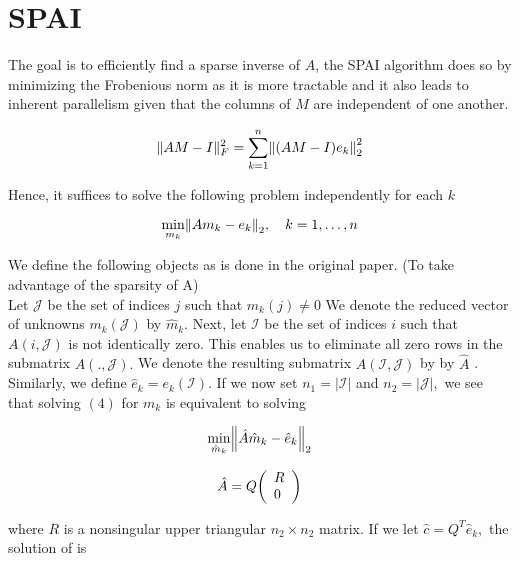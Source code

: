 \documentclass[paper=A4, fontsize=11pt]{scrartcl}
\let\originalleft\left
\let\originalright\right
\renewcommand{\left}{\mathopen{}\mathclose\bgroup\originalleft}
\renewcommand{\right}{\aftergroup\egroup\originalright}
\theoremstyle{remark}
\begin{document}
\section{SPAI}

The goal is to efficiently find a sparse inverse of $A$, the SPAI algorithm does so by minimizing the Frobenious norm as it is more tractable and it also leads to inherent parallelism given that the columns of $M$ are independent of one another.

\begin{equation}
\|A M-I\|_{F}^{2}=\sum_{k=1}^{n}\left\|(A M-I) e_{k}\right\|_{2}^{2}
\end{equation}

Hence, it suffices to solve the following problem independently for each $k$


\begin{equation}
\min _{m_{k}}\left\|A m_{k}-e_{k}\right\|_{2}, \quad k=1, \ldots, n
\end{equation}


We define the following objects as is done in the original paper. (To take advantage of the sparsity of A)\\

Let \(\mathcal{J}\) be the set of indices \(j\) such that \(m_{k}(j) \neq 0\) We denote the reduced vector of unknowns \(m_{k}(\mathcal{J})\) by \(\hat{m}_{k} .\) Next, let \(\mathcal{I}\) be the set of
indices \(i\) such that \(A(i, \mathcal{J})\) is not identically zero. This enables us to eliminate all zero rows in the submatrix \(A( ., \mathcal{J}) .\) We denote the resulting submatrix \(A(\mathcal{I}, \mathcal{J})\) by by
\(\hat{A}\) . Similarly, we define \(\hat{e}_{k}=e_{k}(\mathcal{I}) .\) If we now set \(n_{1}=|\mathcal{I}|\) and \(n_{2}=|\mathcal{J}|,\) we see that
solving \((4)\) for \(m_{k}\) is equivalent to solving

\begin{equation}
\min _{\hat{m}_{k}}\left\|\hat{A} \hat{m}_{k}-\hat{e}_{k}\right\|_{2}
\end{equation}



\begin{equation}
\hat{A}=Q\left(\begin{array}{l}{R} \\ {0}\end{array}\right)
\end{equation}

where \(R\) is a nonsingular upper triangular \(n_{2} \times n_{2}\) matrix. If we let \(\hat{c}=Q^{T} \hat{e}_{k},\) the
solution of  is
\end{document}
